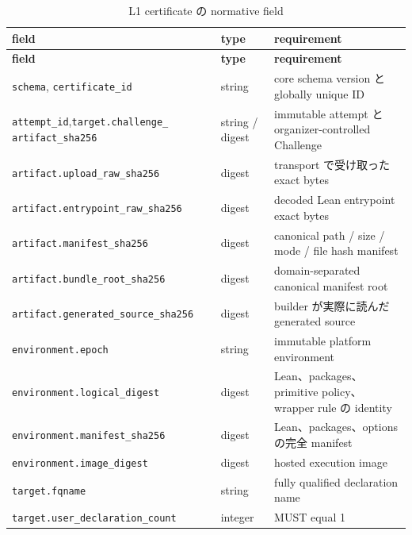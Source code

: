 \documentclass[a4paper,11pt]{ltjsarticle}
\newcommand{\code}[1]{\texttt{#1}}
\begin{document}
\begin{longtable}{@{}L{44mm}L{27mm}L{72mm}@{}}
\caption{L1 certificate の normative field}\label{tab:schema}\\
\toprule
\textbf{field} & \textbf{type} & \textbf{requirement} \\
\midrule
\endfirsthead
\toprule
\textbf{field} & \textbf{type} & \textbf{requirement} \\
\midrule
\endhead
\code{schema}, \code{certificate\_id} & string & core schema version と globally unique ID \\
\code{attempt\_id},\newline\code{target.challenge\_}\newline
\code{artifact\_sha256} & string / digest & immutable attempt と organizer-controlled Challenge \\
\code{artifact.upload\_raw\_}\newline\code{sha256} & digest & transport で受け取った exact bytes \\
\code{artifact.entrypoint\_raw\_}\newline\code{sha256} & digest & decoded Lean entrypoint exact bytes \\
\code{artifact.manifest\_sha256} & digest & canonical path / size / mode / file hash manifest \\
\code{artifact.bundle\_root\_}\newline\code{sha256} & digest & domain-separated canonical manifest root \\
\code{artifact.generated\_}\newline\code{source\_sha256} & digest & builder が実際に読んだ generated source \\
\code{environment.epoch} & string & immutable platform environment \\
\code{environment.}\newline\code{logical\_digest} & digest & Lean、packages、primitive policy、wrapper rule の identity \\
\code{environment.}\newline\code{manifest\_sha256} & digest & Lean、packages、options の完全 manifest \\
\code{environment.image\_digest} & digest & hosted execution image \\
\code{target.fqname} & string & fully qualified declaration name \\
\code{target.user\_}\newline\code{declaration\_count} & integer & MUST equal 1 \\

\end{longtable}
\end{document}
